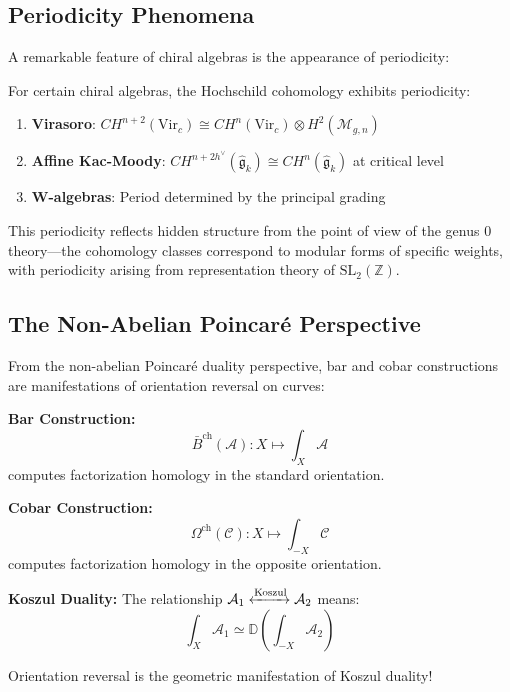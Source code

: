 \subsection{Periodicity Phenomena}

A remarkable feature of chiral algebras is the appearance of periodicity:

\begin{theorem}
For certain chiral algebras, the Hochschild cohomology exhibits periodicity:
\begin{enumerate}
\item \textbf{Virasoro}: $CH^{n+2}(\text{Vir}_c) \cong CH^n(\text{Vir}_c) \otimes H^2(\mathcal{M}_{g,n})$ 
\item \textbf{Affine Kac-Moody}: $CH^{n+2h^\vee}(\widehat{\mathfrak{g}}_k) \cong CH^n(\widehat{\mathfrak{g}}_k)$ at critical level
\item \textbf{W-algebras}: Period determined by the principal grading
\end{enumerate}
\end{theorem}

This periodicity reflects hidden structure from the point of view of the genus $0$ theory—the cohomology classes correspond to modular forms of specific weights, with periodicity arising from representation theory of $\text{SL}_2(\mathbb{Z})$.



\subsection{The Non-Abelian Poincaré Perspective}

\begin{remark}\label{rem:NAP-bar-cobar}
From the non-abelian Poincaré duality perspective, bar and cobar constructions are manifestations of orientation reversal on curves:

\textbf{Bar Construction:}
$$\bar{B}^{\text{ch}}(\mathcal{A}): X \mapsto \int_X \mathcal{A}$$
computes factorization homology in the standard orientation.

\textbf{Cobar Construction:}
$$\Omega^{\text{ch}}(\mathcal{C}): X \mapsto \int_{-X} \mathcal{C}$$
computes factorization homology in the opposite orientation.

\textbf{Koszul Duality:}
The relationship $\mathcal{A}_1 \xleftrightarrow{\text{Koszul}} \mathcal{A}_2$ means:
$$\int_X \mathcal{A}_1 \simeq \mathbb{D}\left(\int_{-X} \mathcal{A}_2\right)$$

Orientation reversal is the geometric manifestation of Koszul duality!
\end{remark}


